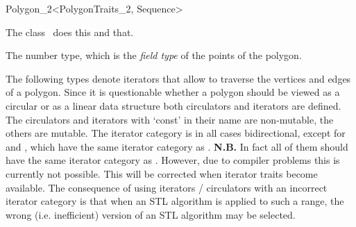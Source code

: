 

\begin{ccRefClass}{Polygon_2<PolygonTraits_2, Sequence>}


\ccDefinition
  
The class \ccRefName\ does this and that.




\ccTypes
{}
\ccGlue
{}

{The number type, which is the {\em field type} of the points of the polygon.} 
\ccGlue
{}
\ccGlue
{}

The following types denote iterators that allow to traverse the vertices and
edges of a polygon. 
Since it is questionable whether a polygon should be viewed as a circular or 
as a linear data structure both circulators and iterators are defined.
The circulators and iterators with `const' in their name are non-mutable, the 
others are mutable.
The iterator category is in all cases bidirectional, except for
 and , which have the
same iterator category as .
{\bf N.B.} In fact all of them should have the same iterator category as
. However, due to compiler problems this is currently
not possible. This will be corrected when iterator traits become available.
The consequence of using iterators / circulators with an incorrect iterator
category is that when an STL algorithm is applied to such a range,
the wrong (i.e. inefficient) version of an STL algorithm may be selected. 


\end{ccRefClass}
